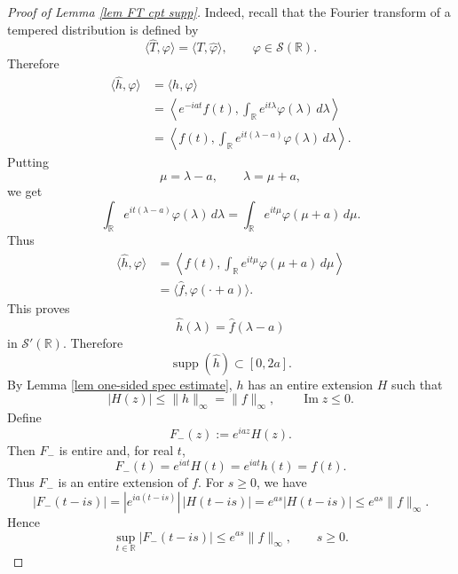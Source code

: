 \documentclass[10pt,a4paper]{amsart}
\begin{document}
\begin{proof}[Proof of Lemma \ref{lem FT cpt supp}]
Indeed, recall that the Fourier transform of a tempered distribution is defined by
\[
        \langle \widehat T,\varphi\rangle
        =
        \langle T,\widehat\varphi\rangle,
        \qquad \varphi\in\mathcal S(\mathbb R).
\]
Therefore
\[
\begin{aligned}
        \langle \widehat h,\varphi\rangle
        &=
        \langle h,\widehat\varphi\rangle                                      \\
        &=
        \left\langle e^{-iat}f(t),
        \int_{\mathbb R}e^{it\lambda}\varphi(\lambda)\,d\lambda
        \right\rangle                                                         \\
        &=
        \left\langle f(t),
        \int_{\mathbb R}e^{it(\lambda-a)}\varphi(\lambda)\,d\lambda
        \right\rangle .
\end{aligned}
\]
Putting
\[
        \mu=\lambda-a,
        \qquad \lambda=\mu+a,
\]
we get
\[
        \int_{\mathbb R}e^{it(\lambda-a)}\varphi(\lambda)\,d\lambda
        =
        \int_{\mathbb R}e^{it\mu}\varphi(\mu+a)\,d\mu.
\]
Thus
\[
\begin{aligned}
        \langle \widehat h,\varphi\rangle
        &=
        \left\langle f(t),
        \int_{\mathbb R}e^{it\mu}\varphi(\mu+a)\,d\mu
        \right\rangle                                                         \\
        &=
        \langle \widehat f,\varphi(\cdot+a)\rangle .
\end{aligned}
\]
This proves
\[
        \widehat h(\lambda)=\widehat f(\lambda-a)
\]
in \(\mathcal S'(\mathbb R)\).
Therefore
\[
        \operatorname{supp}(\widehat h)
        \subset [0,2a].
\]
By Lemma \ref{lem one-sided spec estimate}, \(h\) has an entire extension \(H\) such
that
\[
        |H(z)|\le \|h\|_\infty=\|f\|_\infty,
        \qquad \operatorname{Im}z\le 0.
\]
Define
\[
        F_-(z):=e^{iaz}H(z).
\]
Then \(F_-\) is entire and, for real \(t\),
\[
        F_-(t)
        =
        e^{iat}H(t)
        =
        e^{iat}h(t)
        =
        f(t).
\]
Thus \(F_-\) is an entire extension of \(f\). For \(s\ge 0\), we have
\[
        |F_-(t-is)|
        =
        |e^{ia(t-is)}|\,|H(t-is)|
        =
        e^{as}|H(t-is)|
        \le
        e^{as}\|f\|_\infty .
\]
Hence
\[
        \sup_{t\in\mathbb R}|F_-(t-is)|
        \le
        e^{as}\|f\|_\infty,
        \qquad s\ge 0.
\]


\end{proof}
\end{document}
